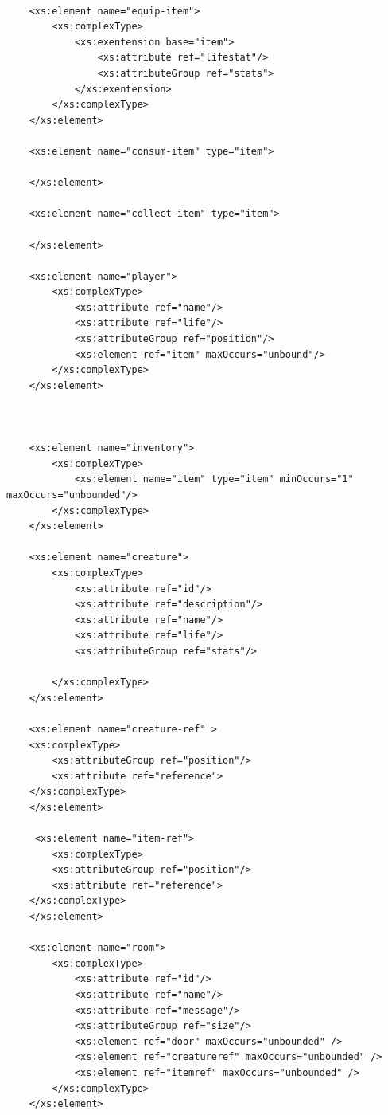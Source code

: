 \begin{lstlisting}
    
    <xs:element name="equip-item">
        <xs:complexType>
            <xs:exentension base="item">
                <xs:attribute ref="lifestat"/>
                <xs:attributeGroup ref="stats">
            </xs:exentension>               
        </xs:complexType>
    </xs:element>
        
    <xs:element name="consum-item" type="item">
            
    </xs:element>
        
    <xs:element name="collect-item" type="item">
            
    </xs:element>
    
    <xs:element name="player">
        <xs:complexType>        
            <xs:attribute ref="name"/>
            <xs:attribute ref="life"/>
            <xs:attributeGroup ref="position"/>    
            <xs:element ref="item" maxOccurs="unbound"/>
        </xs:complexType>
    </xs:element>
    
  
    
    <xs:element name="inventory">
        <xs:complexType>           
            <xs:element name="item" type="item" minOccurs="1" maxOccurs="unbounded"/>         
        </xs:complexType>
    </xs:element>
    
    <xs:element name="creature">
        <xs:complexType>      
            <xs:attribute ref="id"/> 
            <xs:attribute ref="description"/>
            <xs:attribute ref="name"/>
            <xs:attribute ref="life"/>
            <xs:attributeGroup ref="stats"/>
                
        </xs:complexType>
    </xs:element>
    
    <xs:element name="creature-ref" >
    <xs:complexType>
        <xs:attributeGroup ref="position"/>
        <xs:attribute ref="reference">
    </xs:complexType>
    </xs:element>   
    
     <xs:element name="item-ref">
        <xs:complexType>
        <xs:attributeGroup ref="position"/>
        <xs:attribute ref="reference">
    </xs:complexType>
    </xs:element>   
    
    <xs:element name="room">
        <xs:complexType>
            <xs:attribute ref="id"/> 
            <xs:attribute ref="name"/>
            <xs:attribute ref="message"/>
            <xs:attributeGroup ref="size"/>
            <xs:element ref="door" maxOccurs="unbounded" />
            <xs:element ref="creatureref" maxOccurs="unbounded" />
            <xs:element ref="itemref" maxOccurs="unbounded" />
        </xs:complexType>
    </xs:element>
    

\end{lstlisting}
